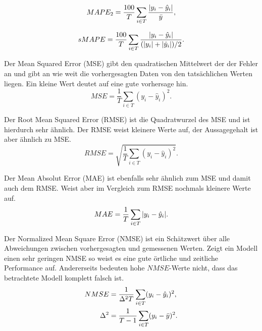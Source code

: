 \begin{equation}
MAPE_2= \frac{100}{T} \sum\limits_{i \in T} \frac{\abs{y_i-\hat{y}_i}}{\bar{y}},
\label{gl:MAPE_2}
\end{equation}

\begin{equation}
sMAPE= \frac{100}{T} \sum\limits_{i \in T} \frac{\abs{y_i-\hat{y}_i}}{(\abs{y_i} + \abs{\hat{y}_i}) / 2}.
\label{gl:sMAPE}
\end{equation}

Der Mean Squared Error (MSE) gibt den quadratischen Mittelwert der der Fehler an und gibt an wie weit die vorhergesagten Daten von den tatsächlichen Werten liegen. Ein kleine Wert deutet auf eine gute vorhersage hin.\,
\begin{equation}
MSE= \frac{1}{T} \sum\limits_{i \in T} (y_i-\hat{y}_i)^2.
\label{gl:MSE}
\end{equation}


Der Root Mean Squared Error (RMSE) ist die Quadratwurzel des MSE und ist hierdurch sehr ähnlich. Der RMSE weist kleinere Werte auf, der Aussagegehalt ist aber ähnlich zu MSE.
\begin{equation}
RMSE= \sqrt{ \frac{1}{T} \sum\limits_{i \in T} (y_i-\hat{y}_i)^2}.
\label{gl:RMSE}
\end{equation}

Der Mean Absolut Error (MAE) ist ebenfalls sehr ähnlich zum MSE und damit auch dem RMSE. Weist aber im Vergleich zum RMSE nochmals kleinere Werte auf.
\begin{equation}
MAE= \frac{1}{T} \sum\limits_{i \in T} \abs{y_i-\hat{y}_i}.
\label{gl:MAE}
\end{equation}


Der Normalized Mean Square Error (NMSE) ist ein Schätzwert über alle Abweichungen zwischen vorhergesagten und gemessenen Werten. Zeigt ein Modell einen sehr geringen NMSE so weist es eine gute örtliche und zeitliche Performance auf. Andererseits bedeuten hohe $NMSE$-Werte nicht, dass das betrachtete Modell komplett falsch ist.
\begin{gather}
\begin{aligned}
NMSE &= \frac{1}{\Delta^2 T} \sum\limits_{i \in T} (y_i-\hat{y}_i)^2,\\ 
\Delta^2 &= \frac{1}{T-1} \sum\limits_{i \in T} (y_i-\bar{y})^2.\\
\end{aligned}
\label{gl:NMSE}
\end{gather}


